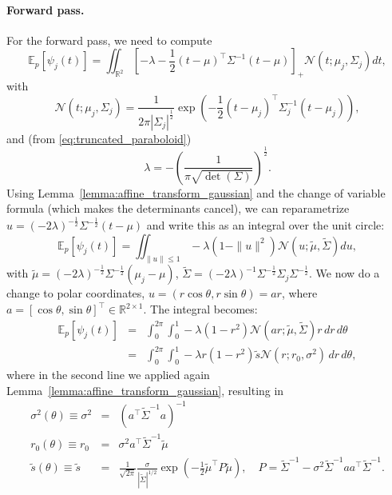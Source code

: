 \documentclass{article}
\begin{document}
\paragraph{Forward pass.}
For the forward pass, we need to compute
\begin{equation}
\mathbb{E}_p[\psi_j(t)] = \iint_{\mathbb{R}^2} \left[-\lambda - \frac{1}{2}(t-\mu)^\top\Sigma^{-1}(t-\mu)\right]_+ \mathcal{N}(t; \mu_j, \Sigma_j) dt,
\end{equation}
with
\begin{equation}
    \mathcal{N}(t;\mu_j, \Sigma_j)=\frac{1}{2\pi\left| \Sigma_j\right|^{\frac{1}{2}}} \exp{\left(-\frac{1}{2}(t-\mu_j)^\top \Sigma_j^{-1}(t-\mu_j)\right)},
\end{equation}
and (from \eqref{eq:truncated_paraboloid})
\begin{equation}
    \lambda=-\left(\frac{1}{\pi\sqrt{\det(\Sigma)}}\right)^{\frac{1}{2}}.
\end{equation}
Using Lemma~\ref{lemma:affine_transform_gaussian} and  the change of variable formula (which makes the determinants cancel), we can reparametrize $u = (-2\lambda)^{-\frac{1}{2}} \Sigma^{-\frac{1}{2}} (t - \mu)$ and write this as an integral over the unit circle:
\begin{equation}
\mathbb{E}_p[\psi_j(t)] = \iint_{\|u\|\le 1} 
-\lambda (1-\|u\|^2) \mathcal{N}(u; \tilde{\mu}, \tilde{\Sigma}) du,
\end{equation}
with $\tilde{\mu} = (-2\lambda)^{-\frac{1}{2}} \Sigma^{-\frac{1}{2}}(\mu_j - \mu)$, 
$\tilde{\Sigma} = (-2\lambda)^{-1} \Sigma^{-\frac{1}{2}} \Sigma_j \Sigma^{-\frac{1}{2}}$. 
We now do a change to polar coordinates, $u = (r\cos\theta, r\sin\theta) = ar$, where $a = [\cos \theta, \sin \theta]^\top \in \mathbb{R}^{2\times 1}$. The integral becomes:
\begin{eqnarray}
\mathbb{E}_p[\psi_j(t)] &=& \int_{0}^{2\pi} \int_{0}^1 
-\lambda (1-r^2) \mathcal{N}(ar; \tilde{\mu}, \tilde{\Sigma}) r \, dr \, d\theta\nonumber\\
&=& \int_{0}^{2\pi} \int_{0}^1 
-\lambda r(1-r^2) \tilde{s} \mathcal{N}(r; r_0, \sigma^2) \, dr \, d\theta,
\end{eqnarray}
where in the second line we applied again Lemma~\ref{lemma:affine_transform_gaussian}, resulting in 
\begin{eqnarray*}
\sigma^2(\theta) \equiv \sigma^2 &=& (a^\top \tilde{\Sigma}^{-1} a)^{-1}\\
r_0(\theta) \equiv r_0 &=& \sigma^2 a^\top \tilde{\Sigma}^{-1} \tilde{\mu}\\
\tilde{s}(\theta) \equiv \tilde{s} &=& \frac{1}{\sqrt{2\pi}}  \frac{\sigma}{|\tilde{\Sigma}|^{1/2}} \exp\left(-\frac{1}{2}\tilde{\mu}^\top P\tilde{\mu}\right), \quad P = \tilde{\Sigma}^{-1} - \sigma^2 \tilde{\Sigma}^{-1} a a^\top\tilde{\Sigma}^{-1}.
\end{eqnarray*}
\end{document}
